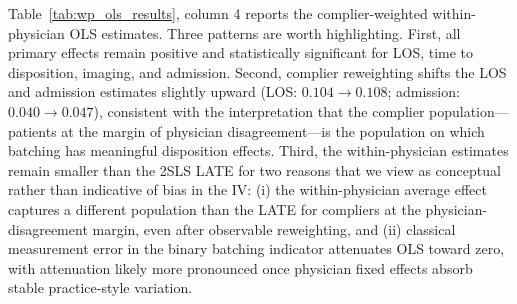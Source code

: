 \documentclass[11pt]{article}
\newcommand{\1}{\hbox{\rm 1\kern-.35em 1}}
\begin{document}
Table~\ref{tab:wp_ols_results}, column 4 reports the complier-weighted within-physician OLS estimates. Three patterns are worth highlighting. First, all primary effects remain positive and statistically significant for LOS, time to disposition, imaging, and admission. Second, complier reweighting shifts the LOS and admission estimates slightly upward (LOS: $0.104 \to 0.108$; admission: $0.040 \to 0.047$), consistent with the interpretation that the complier population---patients at the margin of physician disagreement---is the population on which batching has meaningful disposition effects. Third, the within-physician estimates remain smaller than the 2SLS LATE for two reasons that we view as conceptual rather than indicative of bias in the IV: (i) the within-physician average effect captures a different population than the LATE for compliers at the physician-disagreement margin, even after observable reweighting, and (ii) classical measurement error in the binary batching indicator attenuates OLS toward zero, with attenuation likely more pronounced once physician fixed effects absorb stable practice-style variation.
\end{document}
